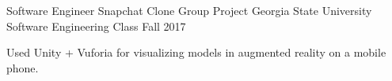 

\begin{cventries}

  \cventry
    {Software Engineer} %
	{Snapchat Clone Group Project} %
    {Georgia State University Software Engineering Class} %
    {Fall 2017} %
    {
      \begin{cvitems} %
        \item {Used Unity + Vuforia for visualizing models in augmented reality on a mobile phone.}
      \end{cvitems}
    }
\end{cventries}
\pagebreak
